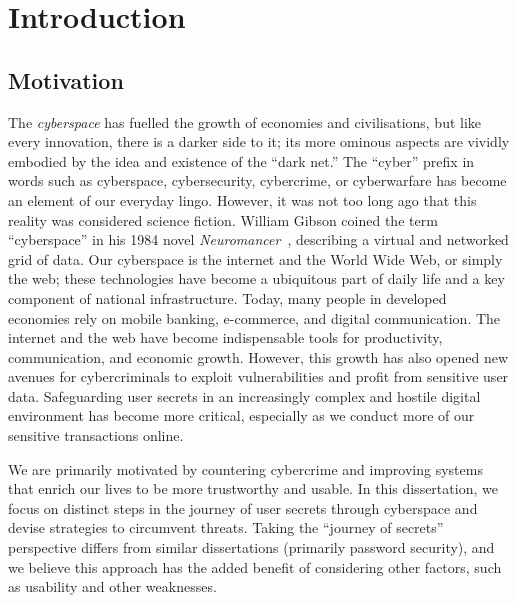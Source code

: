 \chapter{Introduction}
\label{chp::introduction}

\vspace*{0.5cm}
\section{Motivation}
\label{sec::chp1::motivation}

The \textit{cyberspace} has fuelled the growth of economies and civilisations, but like every innovation, there is a darker side to it; its more ominous aspects are vividly embodied by the idea and existence of the ``dark net.'' The ``cyber'' prefix in words such as cyberspace, cybersecurity, cybercrime, or cyberwarfare has become an element of our everyday lingo. However, it was not too long ago that this reality was considered science fiction. William Gibson coined the term ``cyberspace'' in his 1984 novel \textit{Neuromancer}~\cite{gibson_neuromancer_1984}, describing a virtual and networked grid of data. Our cyberspace is the internet and the World Wide Web, or simply the web; these technologies have become a ubiquitous part of daily life and a key component of national infrastructure. Today, many people in developed economies rely on mobile banking, e-commerce, and digital communication. The internet and the web have become indispensable tools for productivity, communication, and economic growth. However, this growth has also opened new avenues for cybercriminals to exploit vulnerabilities and profit from sensitive user data. Safeguarding user secrets in an increasingly complex and hostile digital environment has become more critical, especially as we conduct more of our sensitive transactions online.

\newpage
We are primarily motivated by countering cybercrime and improving systems that enrich our lives to be more trustworthy and usable. In this dissertation, we focus on distinct steps in the journey of user secrets through cyberspace and devise strategies to circumvent threats. Taking the ``journey of secrets'' perspective differs from similar dissertations \cite{bonneau_guessing_2012, pasquini_enabling_2021, ur_supporting_2016} (primarily password security), and we believe this approach has the added benefit of considering other factors, such as usability and other weaknesses.


